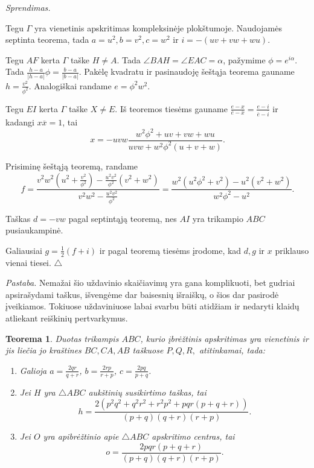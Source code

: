 \documentclass[11pt,a4paper,twoside]{book}
\newenvironment{sprendimas}{\noindent \textit{Sprendimas.}}{\hfill $\triangle$}
\newtheorem{thmnr}{Teorema}
\theoremstyle{definition} \newtheorem*{api}{Apibrėžimas}
\theoremstyle{remark} \newtheorem*{pastaba}{Pastaba}
\begin{document}
\begin{sprendimas}

Tegu $\Gamma$ yra vienetinis apskritimas kompleksinėje plokštumoje. Naudojamės septinta teorema, tada $a=u^2, b=v^2, c=w^2$ ir $i = -(uv+vw+wu).$

Tegu $AF$ kerta $\Gamma$ taške $H\ne A$. Tada $\angle BAH =\angle EAC =\alpha$, pažymime $\phi=e^{i\alpha}$. Tada $\frac{h-a}{|h-a|}\phi=\frac{b-a}{|b-a|}.$ Pakėlę kvadratu ir pasinaudoję šeštąja teorema gauname $h=\frac{v^2}{\phi^2}$. Analogiškai randame $e=\phi^2w^2$.

Tegu $EI$ kerta $\Gamma$ taške $X \ne E$. Iš teoremos tiesėms gauname $\frac{e-x}{\overline{e}-\overline{x}}=\frac{e-i}{\overline{e}-\overline{i}}$ ir kadangi $x\overline{x}=1$, tai 
$$x=-uvw\frac{w^2\phi ^2 +uv+vw+wu}{uvw +w^2\phi ^2(u+v+w)}.$$

Prisiminę šeštąją teoremą, randame 
$$f=\frac{v^2w^2(u^2 + \frac{v^2}{\phi ^2}) - \frac{u^2v^2}{\phi ^2}(v^2+w^2)}{v^2w^2 - \frac{u^2v^2}{\phi ^2}}=\frac{w^2(u^2\phi^2 + v^2) - u^2(v^2+w^2)}{w^2\phi^2 - u^2}.$$

Taškas $d=-vw$ pagal septintąją teoremą, nes $AI$ yra trikampio $ABC$ pusiaukampinė.

Galiausiai $g=\frac{1}{2}(f+i)$ ir pagal teoremą tiesėms įrodome, kad $d, g$ ir $x$ priklauso vienai tiesei.
\end{sprendimas}

\textit {Pastaba.} Nemažai šio uždavinio skaičiavimų yra gana komplikuoti, bet gudriai apsirašydami taškus, išvengėme dar baisesnių išraiškų, o šios dar pasirodė įveikiamos. Tokiuose uždaviniuose labai svarbu būti atidžiam ir nedaryti klaidų atliekant reiškinių pertvarkymus.













\begin{thmnr} Duotas trikampis $ABC$, kurio įbrėžtinis apskritimas yra vienetinis ir jis liečia jo kraštines $BC, CA, AB$ taškuose $P, Q, R,$ atitinkamai, tada:
\begin{enumerate}
\item Galioja $a=\frac{2qr}{q+r}$, $b=\frac{2rp}{r+p}$, $c=\frac{2pq}{p+q}$.
\item Jei $H$ yra $\bigtriangleup ABC$ aukštinių susikirtimo taškas, tai
$$h=\frac{2(p^2q^2 + q^2r^2 + r^2p^2 + pqr(p + q+ r))}{(p+q)(q+r)(r+p)}.$$
\item Jei $O$ yra apibrėžtinio apie  $\bigtriangleup ABC$ apskritimo centras, tai
$$o=\frac{2pqr(p+q+r)}{(p+q)(q+r)(r+p)}.$$
\end{enumerate}
\end{thmnr}
\end{document}
